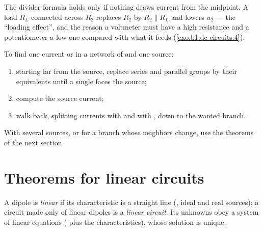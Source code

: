\begin{remark}\label{rem:b1:dc-circuits:loading}
The divider formula holds only if nothing draws current from the
midpoint. A load $R_L$ connected across $R_2$ replaces $R_2$ by $R_2
\parallel R_L$ and lowers $u_2$ --- the ``loading effect'', and the
reason a voltmeter must have a high resistance and a potentiometer a
low one compared with what it feeds
(\cref{exo:b1:dc-circuits:4}).
\end{remark}

\begin{method}\label{met:b1:dc-circuits:reduce}
To find one current or  in a network of  and one
source:
\begin{enumerate}
  \item starting far from the source, replace series and parallel
        groups by their equivalents until a single  faces the
        source;
  \item compute the source current;
  \item walk back, splitting currents with  and
         with , down to the wanted branch.
\end{enumerate}
With several sources, or for a branch whose neighbors change, use the
theorems of the next section.
\end{method}

\section{Theorems for linear circuits}

\begin{definition}\label{def:b1:dc-circuits:linear}
A dipole is \emph{linear} if its characteristic is a straight line
(, ideal and real sources); a circuit made only of linear
dipoles is a \emph{linear circuit}. Its unknowns obey a system of
linear equations ( plus the characteristics), whose
solution is unique.
\end{definition}

